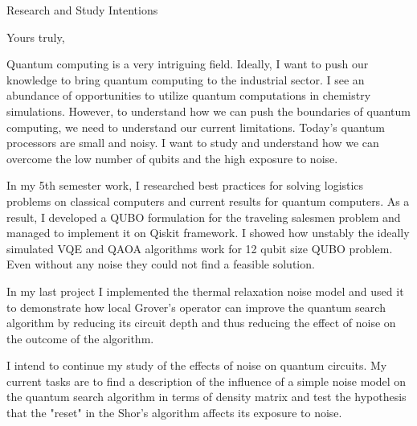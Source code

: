 \documentclass[11pt,a4paper,sans]{moderncv}        %
\begin{document}
	\clearpage
	\date{June 05, 2022}
	\opening{Research and Study Intentions}
	\closing{Yours truly,}
	\makelettertitle
	
	Quantum computing is a very intriguing field. Ideally, I want to push our knowledge to bring quantum computing to the industrial sector. I see an abundance of opportunities to utilize quantum computations in chemistry simulations. However, to understand how we can push the boundaries of quantum computing, we need to understand our current limitations. Today's quantum processors are small and noisy. I want to study and understand how we can overcome the low number of qubits and the high exposure to noise.
	
	In my 5th semester work, I researched best practices for solving logistics problems on classical computers and current results for quantum computers. As a result, I developed a QUBO formulation for the traveling salesmen problem and managed to implement it on Qiskit framework. I showed how unstably the ideally simulated VQE and QAOA algorithms work for 12 qubit size QUBO problem. Even without any noise they could not find a feasible solution.
	
	In my last project I implemented the thermal relaxation noise model and used it to demonstrate how local Grover's operator can improve the quantum search algorithm by reducing its circuit depth and thus reducing the effect of noise on the outcome of the algorithm.
	
	
	I intend to continue my study of the effects of noise on quantum circuits. My current tasks are to find a description of the influence of a simple noise model on the quantum search algorithm in terms of density matrix and test the hypothesis that the "reset" in the Shor's algorithm affects its exposure to noise.
	
\end{document}
